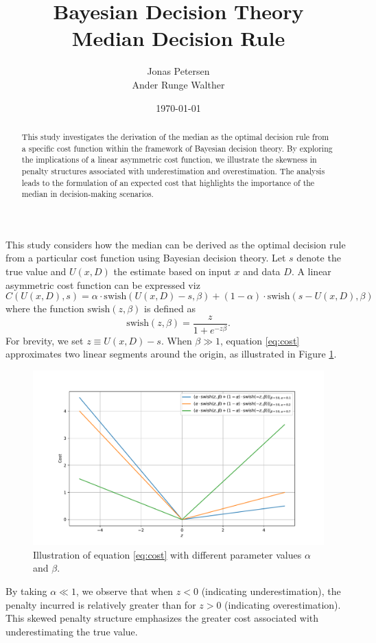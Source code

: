 \documentclass[a4paper,12pt]{article}
\title{Bayesian Decision Theory\\
	\small{Median Decision Rule}}
\author{Jonas Petersen \\ Ander Runge Walther }
\date{\today}
\theoremstyle{definition}
\begin{document}
	\maketitle
	
	\begin{abstract}
		This study investigates the derivation of the median as the optimal decision rule from a specific cost function within the framework of Bayesian decision theory. By exploring the implications of a linear asymmetric cost function, we illustrate the skewness in penalty structures associated with underestimation and overestimation. The analysis leads to the formulation of an expected cost that highlights the importance of the median in decision-making scenarios.
	\end{abstract}
	
	\noindent
	This study considers how the median can be derived as the optimal decision rule from a particular cost function using Bayesian decision theory. Let $s$ denote the true value and $U(x,D)$ the estimate based on input $x$ and data $D$. A linear asymmetric cost function can be expressed viz
	\begin{equation}
		C(U(x,D), s) = \alpha \cdot \text{swish}(U(x,D) - s, \beta) + (1 - \alpha) \cdot \text{swish}(s - U(x,D), \beta)
		\label{eq:cost}
	\end{equation}
	where the function $\text{swish}(z,\beta)$ is defined as
	\begin{equation}
		\text{swish}(z,\beta) = \frac{z}{1 + e^{-z\beta}}.
	\end{equation}
	For brevity, we set $z \equiv U(x,D) - s$. When $\beta \gg 1$, equation \eqref{eq:cost} approximates two linear segments around the origin, as illustrated in Figure \ref{fig:1}.
	\begin{figure}[H]
		\centering
		\includegraphics[width=1\textwidth]{figures/cost_plot.pdf}
		\caption{Illustration of equation \eqref{eq:cost} with different parameter values $\alpha$ and $\beta$.}
		\label{fig:1}
	\end{figure}
	By taking $\alpha \ll 1$, we observe that when $z < 0$ (indicating underestimation), the penalty incurred is relatively greater than for $z > 0$ (indicating overestimation). This skewed penalty structure emphasizes the greater cost associated with underestimating the true value.
	
\end{document}

